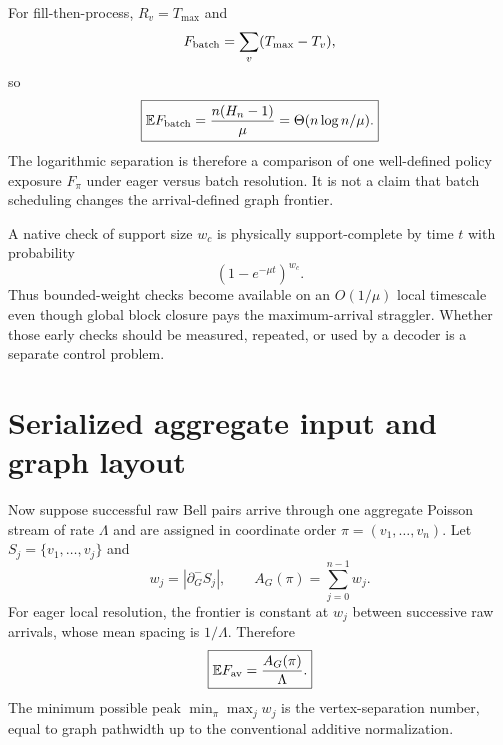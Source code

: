 \documentclass[aps,prx,reprint,superscriptaddress,nofootinbib,longbibliography,floatfix]{revtex4-2}
\newcommand{\E}{\mathbb E}\newcommand{\Prob}{\mathbb P}
\begin{document}
For fill-then-process, $R_v=T_{\max}$ and
\begin{equation}
F_{\rm batch}=\sum_v(T_{\max}-T_v),
\end{equation}
so
\begin{equation}
\boxed{\E F_{\rm batch}=\frac{n(H_n-1)}{\mu}
=\Theta(n\log n/\mu).}
\end{equation}
The logarithmic separation is therefore a comparison of one well-defined policy exposure $F_\pi$ under eager versus batch resolution. It is not a claim that batch scheduling changes the arrival-defined graph frontier.

A native check of support size $w_c$ is physically support-complete by time $t$ with probability
\begin{equation}
(1-e^{-\mu t})^{w_c}.
\end{equation}
Thus bounded-weight checks become available on an $O(1/\mu)$ local timescale even though global block closure pays the maximum-arrival straggler. Whether those early checks should be measured, repeated, or used by a decoder is a separate control problem.

\section{Serialized aggregate input and graph layout}
Now suppose successful raw Bell pairs arrive through one aggregate Poisson stream of rate $\Lambda$ and are assigned in coordinate order $\pi=(v_1,\ldots,v_n)$. Let $S_j=\{v_1,\ldots,v_j\}$ and
\begin{equation}
w_j=|\partial_G^-S_j|,\qquad A_G(\pi)=\sum_{j=0}^{n-1}w_j.
\end{equation}
For eager local resolution, the frontier is constant at $w_j$ between successive raw arrivals, whose mean spacing is $1/\Lambda$. Therefore
\begin{equation}
\boxed{\E F_{\rm av}=\frac{A_G(\pi)}{\Lambda}.}
\label{eq:serialarea}
\end{equation}
The minimum possible peak $\min_\pi\max_jw_j$ is the vertex-separation number, equal to graph pathwidth up to the conventional additive normalization.
\end{document}
